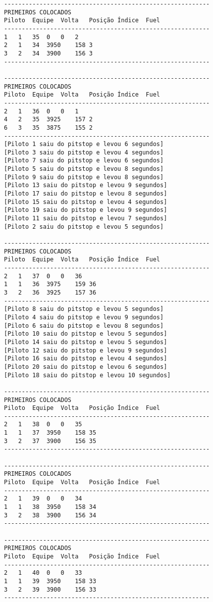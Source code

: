 \documentclass[12pt]{article}
\begin{document}
\begin{verbatim}
----------------------------------------------------------
PRIMEIROS COLOCADOS
Piloto	Equipe	Volta	Posição	Índice	Fuel
----------------------------------------------------------
1	1	35	0	0	2
2	1	34	3950	158	3
3	2	34	3900	156	3
----------------------------------------------------------

----------------------------------------------------------
PRIMEIROS COLOCADOS
Piloto	Equipe	Volta	Posição	Índice	Fuel
----------------------------------------------------------
2	1	36	0	0	1
4	2	35	3925	157	2
6	3	35	3875	155	2
----------------------------------------------------------
[Piloto 1 saiu do pitstop e levou 6 segundos]
[Piloto 3 saiu do pitstop e levou 4 segundos]
[Piloto 7 saiu do pitstop e levou 6 segundos]
[Piloto 5 saiu do pitstop e levou 8 segundos]
[Piloto 9 saiu do pitstop e levou 8 segundos]
[Piloto 13 saiu do pitstop e levou 9 segundos]
[Piloto 17 saiu do pitstop e levou 8 segundos]
[Piloto 15 saiu do pitstop e levou 4 segundos]
[Piloto 19 saiu do pitstop e levou 9 segundos]
[Piloto 11 saiu do pitstop e levou 7 segundos]
[Piloto 2 saiu do pitstop e levou 5 segundos]

----------------------------------------------------------
PRIMEIROS COLOCADOS
Piloto	Equipe	Volta	Posição	Índice	Fuel
----------------------------------------------------------
2	1	37	0	0	36
1	1	36	3975	159	36
3	2	36	3925	157	36
----------------------------------------------------------
[Piloto 8 saiu do pitstop e levou 5 segundos]
[Piloto 4 saiu do pitstop e levou 9 segundos]
[Piloto 6 saiu do pitstop e levou 8 segundos]
[Piloto 10 saiu do pitstop e levou 5 segundos]
[Piloto 14 saiu do pitstop e levou 5 segundos]
[Piloto 12 saiu do pitstop e levou 9 segundos]
[Piloto 16 saiu do pitstop e levou 4 segundos]
[Piloto 20 saiu do pitstop e levou 6 segundos]
[Piloto 18 saiu do pitstop e levou 10 segundos]

----------------------------------------------------------
PRIMEIROS COLOCADOS
Piloto	Equipe	Volta	Posição	Índice	Fuel
----------------------------------------------------------
2	1	38	0	0	35
1	1	37	3950	158	35
3	2	37	3900	156	35
----------------------------------------------------------

----------------------------------------------------------
PRIMEIROS COLOCADOS
Piloto	Equipe	Volta	Posição	Índice	Fuel
----------------------------------------------------------
2	1	39	0	0	34
1	1	38	3950	158	34
3	2	38	3900	156	34
----------------------------------------------------------

----------------------------------------------------------
PRIMEIROS COLOCADOS
Piloto	Equipe	Volta	Posição	Índice	Fuel
----------------------------------------------------------
2	1	40	0	0	33
1	1	39	3950	158	33
3	2	39	3900	156	33
----------------------------------------------------------


\end{verbatim}
\end{document}
